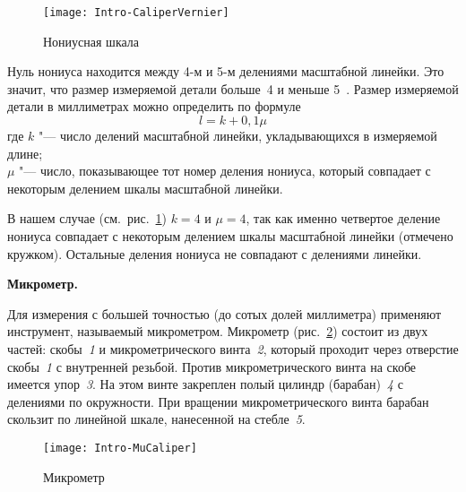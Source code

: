 \documentclass[a4paper, 12pt]{extarticle}
\begin{document}
\begin{figure}[h]
 \begin{center}
  \texttt{[image: Intro-CaliperVernier]}
  \caption{Нониусная шкала \label{fig:mzero-vernier-scale}}
 \end{center}
\end{figure}


Нуль нониуса находится между 4-м и 5-м делениями масштабной линейки. Это значит, что размер измеряемой детали больше~4 и меньше 5~. Размер измеряемой детали в миллиметрах можно определить по формуле
\begin{equation}
\label{eq:how-do-i-caliper}
l = k + 0,1\mu
\end{equation}
где $k$ "--- число делений масштабной линейки, укладывающихся в измеряемой длине; \\
$\mu$ "--- число, показывающее тот номер деления нониуса, который совпадает  с некоторым делением шкалы масштабной линейки.

В нашем случае (см.~рис.~\ref{fig:mzero-vernier-scale}) $k = 4$ и $\mu = 4$, так как именно четвертое деление нониуса совпадает с некоторым делением шкалы масштабной линейки (отмечено кружком). Остальные деления нониуса не совпадают с делениями линейки.





\textbf{Микрометр.}

Для измерения с большей точностью (до сотых долей миллиметра) применяют инструмент, называемый микрометром. Микрометр (рис.~\ref{fig:mzero-mu-caliper}) состоит из двух частей: скобы~\emph{1} и микрометрического винта~\emph{2}, который проходит через отверстие скобы~\emph{1} с внутренней резьбой. Против микрометрического винта на скобе имеется упор~\emph{3}. На этом винте закреплен полый цилиндр (барабан)~\emph{4} с делениями по окружности. При вращении микрометрического винта барабан скользит по линейной шкале, нанесенной на стебле~\emph{5}.

\begin{figure}[ht]
 \begin{center}
  \texttt{[image: Intro-MuCaliper]}
  \caption{Микрометр \label{fig:mzero-mu-caliper}}
 \end{center}
\end{figure}
\end{document}
